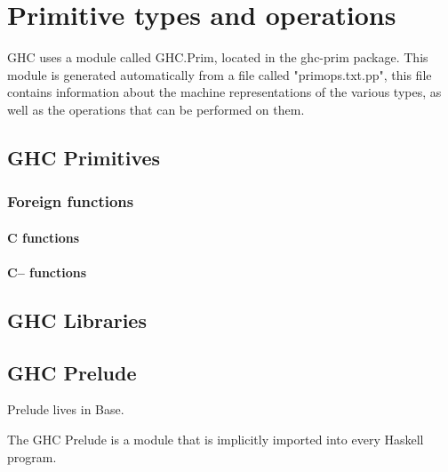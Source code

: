 

\chapter{Primitive types and operations}

GHC uses a module called GHC.Prim, located in the ghc-prim package. This
module is generated automatically from a file called "primops.txt.pp", this file
contains information about the machine representations of the various types, as
well as the operations that can be performed on them.

\section{GHC Primitives}

\subsection{Foreign functions}

\subsubsection{C functions}

\subsubsection{C-- functions}

\section{GHC Libraries}



\section{GHC Prelude}

Prelude lives in Base.

The GHC Prelude is a module that is implicitly imported into every Haskell program.

